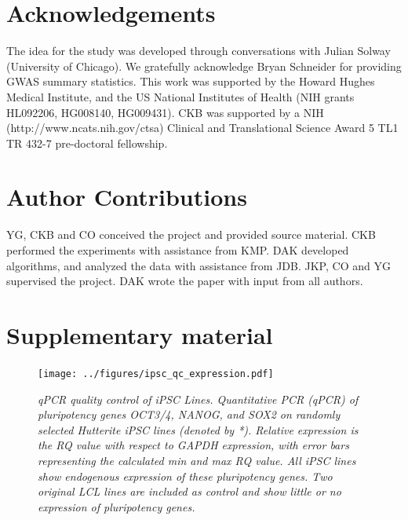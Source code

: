\documentclass{article}
\begin{document}
\section*{Acknowledgements}

The idea for the study was developed through conversations with Julian Solway (University of Chicago). We gratefully acknowledge Bryan Schneider for providing GWAS summary statistics. This work was supported by the Howard Hughes Medical Institute, and the US National Institutes of Health (NIH grants HL092206, HG008140, HG009431). 
CKB was supported by a NIH (http://www.ncats.nih.gov/ctsa) Clinical and Translational Science Award 5 TL1 TR 432-7 pre-doctoral fellowship.

\section*{Author Contributions}

YG, CKB and CO conceived the project and provided source material.
CKB performed the experiments with assistance from KMP.
DAK developed algorithms, and analyzed the data with assistance from JDB.
JKP, CO and YG supervised the project.
DAK wrote the paper with input from all authors.

     
\clearpage

\setcounter{figure}{0}
\makeatletter 
\renewcommand{\thefigure}{S\@arabic\c@figure}

\section*{Supplementary material} 


\begin{figure}[h]
\begin{center}
    \texttt{[image: ../figures/ipsc\_qc\_expression.pdf]} 
    \caption{\it{qPCR quality control of iPSC Lines. Quantitative PCR (qPCR) of pluripotency genes OCT3/4, NANOG, and SOX2 on randomly selected Hutterite iPSC lines (denoted by *). Relative expression is the RQ value with respect to GAPDH expression, with error bars representing the calculated min and max RQ value. All iPSC lines show endogenous expression of these pluripotency genes. Two original LCL lines are included as control and show little or no expression of pluripotency genes.}}
    \label{fig:ipsc_qc_expression}
    \end{center}
\end{figure}
\end{document}
